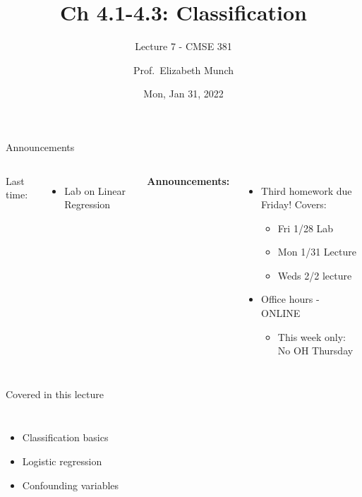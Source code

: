 \documentclass[aspectratio=169,usenames,dvipsnames]{beamer}
\begin{document}
\title[]{Ch 4.1-4.3: Classification}
\subtitle{Lecture 7 - CMSE 381}
\date{Mon, Jan 31, 2022}



\author[Dr.~Munch]{Prof.~Elizabeth Munch}

\begin{frame}
 \titlepage


\end{frame}
\begin{frame}[c]{Announcements}

\begin{columns}
\centering

	Last time:
	\begin{itemize}
		\item Lab on Linear Regression
	\end{itemize}
\centering

\textbf{Announcements:}
	\begin{itemize}
		\item Third homework due Friday! Covers:
		\begin{itemize}
			\item Fri 1/28 Lab
			\item Mon 1/31 Lecture
			\item Weds 2/2 lecture
		\end{itemize}
		\item Office hours - ONLINE
		\begin{itemize}
			\item This week only: No OH Thursday
		\end{itemize}
	\end{itemize}
\end{columns}

\end{frame}
\begin{frame}[c]{Covered in this lecture }

\begin{columns}
\centering
\begin{itemize}
	\item Classification basics
	\item Logistic regression
	\item Confounding variables
\end{itemize}
\centering

\end{columns}

\end{frame}
\end{document}
